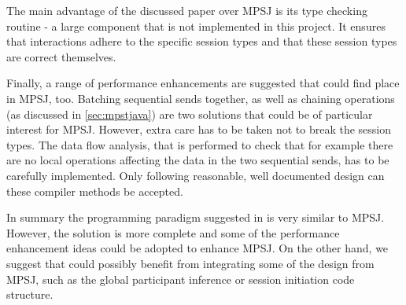 The main advantage of the discussed paper over MPSJ is its type checking routine - a large component that is not implemented in this project. It ensures that interactions adhere to the specific session types and that these session types are correct themselves.

Finally, a range of performance enhancements are suggested that could find place in MPSJ, too. Batching sequential sends together, as well as chaining operations (as discussed in \autoref{sec:mpstjava}) are two solutions that could be of particular interest for MPSJ. However, extra care has to be taken not to break the session types. The data flow analysis, that is performed to check that for example there are no local operations affecting the data in the two sequential sends, has to be carefully implemented. Only following reasonable, well documented design can these compiler methods be accepted.

In summary the programming paradigm suggested in \cite{sess_type_guided_distr_interact} is very similar to MPSJ. However, the solution is more complete and some of the performance enhancement ideas could be adopted to enhance MPSJ. On the other hand, we suggest that \cite{sess_type_guided_distr_interact} could possibly benefit from integrating some of the design from MPSJ, such as the global participant inference or session initiation code structure. 

